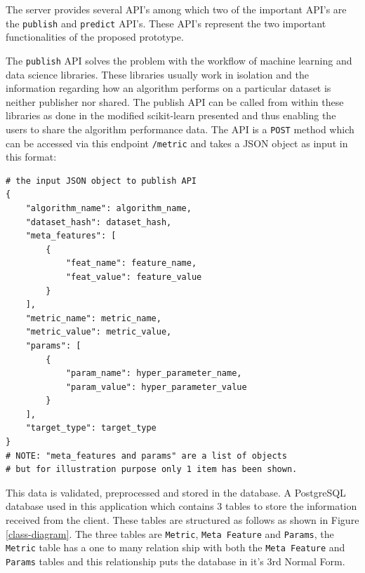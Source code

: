 The server provides several API's among which two of the important API's are the \texttt{publish} and \texttt{predict} API's. These API's represent the two important functionalities of the proposed prototype. 

The \texttt{publish} API solves the problem with the workflow of machine learning and data science libraries. These libraries usually work in isolation and the information regarding how an algorithm performs on a particular dataset is neither publisher nor shared. The publish API can be called from within these libraries as done in the modified scikit-learn presented and thus enabling the users to share the algorithm performance data. The API is a \texttt{POST} method which can be accessed via this endpoint \texttt{/metric} and takes a JSON object as input in this format:

\begin{lstlisting}
# the input JSON object to publish API
{
	"algorithm_name": algorithm_name,
	"dataset_hash": dataset_hash,
	"meta_features": [
		{
			"feat_name": feature_name,
			"feat_value": feature_value
		}
	],
	"metric_name": metric_name,
	"metric_value": metric_value,
	"params": [
		{
			"param_name": hyper_parameter_name,
			"param_value": hyper_parameter_value
		}
	],
	"target_type": target_type
}
# NOTE: "meta_features and params" are a list of objects
# but for illustration purpose only 1 item has been shown.
\end{lstlisting}

This data is validated, preprocessed and stored in the database. A PostgreSQL database used in this application which contains 3 tables to store the information received from the client. These tables are structured as follows as shown in Figure \ref{class-diagram}. The three tables are \texttt{Metric}, \texttt{Meta Feature} and \texttt{Params}, the \texttt{Metric} table has a one to many relation ship with both the \texttt{Meta Feature} and \texttt{Params} tables and this relationship puts the database in it's 3rd Normal Form.

